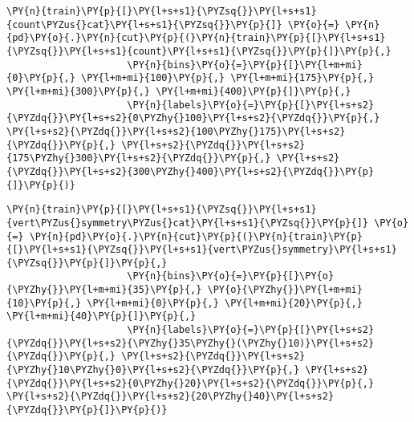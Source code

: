     \begin{tcolorbox}[breakable, size=fbox, boxrule=1pt, pad at break*=1mm,colback=cellbackground, colframe=cellborder]
\begin{Verbatim}[commandchars=\\\{\}]
\PY{n}{train}\PY{p}{[}\PY{l+s+s1}{\PYZsq{}}\PY{l+s+s1}{count\PYZus{}cat}\PY{l+s+s1}{\PYZsq{}}\PY{p}{]} \PY{o}{=} \PY{n}{pd}\PY{o}{.}\PY{n}{cut}\PY{p}{(}\PY{n}{train}\PY{p}{[}\PY{l+s+s1}{\PYZsq{}}\PY{l+s+s1}{count}\PY{l+s+s1}{\PYZsq{}}\PY{p}{]}\PY{p}{,}
                     \PY{n}{bins}\PY{o}{=}\PY{p}{[}\PY{l+m+mi}{0}\PY{p}{,} \PY{l+m+mi}{100}\PY{p}{,} \PY{l+m+mi}{175}\PY{p}{,} \PY{l+m+mi}{300}\PY{p}{,} \PY{l+m+mi}{400}\PY{p}{]}\PY{p}{,}
                     \PY{n}{labels}\PY{o}{=}\PY{p}{[}\PY{l+s+s2}{\PYZdq{}}\PY{l+s+s2}{0\PYZhy{}100}\PY{l+s+s2}{\PYZdq{}}\PY{p}{,} \PY{l+s+s2}{\PYZdq{}}\PY{l+s+s2}{100\PYZhy{}175}\PY{l+s+s2}{\PYZdq{}}\PY{p}{,} \PY{l+s+s2}{\PYZdq{}}\PY{l+s+s2}{175\PYZhy{}300}\PY{l+s+s2}{\PYZdq{}}\PY{p}{,} \PY{l+s+s2}{\PYZdq{}}\PY{l+s+s2}{300\PYZhy{}400}\PY{l+s+s2}{\PYZdq{}}\PY{p}{]}\PY{p}{)}
\end{Verbatim}
\end{tcolorbox}

    \begin{tcolorbox}[breakable, size=fbox, boxrule=1pt, pad at break*=1mm,colback=cellbackground, colframe=cellborder]
\begin{Verbatim}[commandchars=\\\{\}]
\PY{n}{train}\PY{p}{[}\PY{l+s+s1}{\PYZsq{}}\PY{l+s+s1}{vert\PYZus{}symmetry\PYZus{}cat}\PY{l+s+s1}{\PYZsq{}}\PY{p}{]} \PY{o}{=} \PY{n}{pd}\PY{o}{.}\PY{n}{cut}\PY{p}{(}\PY{n}{train}\PY{p}{[}\PY{l+s+s1}{\PYZsq{}}\PY{l+s+s1}{vert\PYZus{}symmetry}\PY{l+s+s1}{\PYZsq{}}\PY{p}{]}\PY{p}{,}
                     \PY{n}{bins}\PY{o}{=}\PY{p}{[}\PY{o}{\PYZhy{}}\PY{l+m+mi}{35}\PY{p}{,} \PY{o}{\PYZhy{}}\PY{l+m+mi}{10}\PY{p}{,} \PY{l+m+mi}{0}\PY{p}{,} \PY{l+m+mi}{20}\PY{p}{,} \PY{l+m+mi}{40}\PY{p}{]}\PY{p}{,}
                     \PY{n}{labels}\PY{o}{=}\PY{p}{[}\PY{l+s+s2}{\PYZdq{}}\PY{l+s+s2}{\PYZhy{}35\PYZhy{}(\PYZhy{}10)}\PY{l+s+s2}{\PYZdq{}}\PY{p}{,} \PY{l+s+s2}{\PYZdq{}}\PY{l+s+s2}{\PYZhy{}10\PYZhy{}0}\PY{l+s+s2}{\PYZdq{}}\PY{p}{,} \PY{l+s+s2}{\PYZdq{}}\PY{l+s+s2}{0\PYZhy{}20}\PY{l+s+s2}{\PYZdq{}}\PY{p}{,} \PY{l+s+s2}{\PYZdq{}}\PY{l+s+s2}{20\PYZhy{}40}\PY{l+s+s2}{\PYZdq{}}\PY{p}{]}\PY{p}{)}
\end{Verbatim}
\end{tcolorbox}

